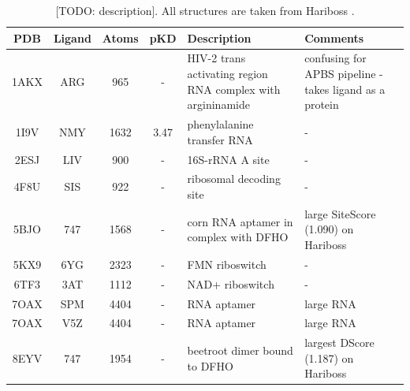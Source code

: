   \begin{table}[H]
    \caption{\label{tab:appx1/benchmark_rna} [TODO: description]. All structures are taken from Hariboss \cite{hariboss_2022}.}
    \centering
    \begin{tabular}{ccccp{1.5in}p{1.5in}}
      \hline
      PDB  & Ligand  & Atoms & pKD  & Description                                                 & Comments                                                \\ \hline
      1AKX & ARG     & 965   & -    & HIV-2 trans activating region RNA complex with argininamide & confusing for APBS pipeline - takes ligand as a protein \\ \hline
      1I9V & NMY     & 1632  & 3.47 & phenylalanine transfer RNA                                  & -                                                       \\ \hline
      2ESJ & LIV     & 900   & -    & 16S-rRNA A site                                             & -                                                       \\ \hline
      4F8U & SIS     & 922   & -    & ribosomal decoding site                                     & -                                                       \\ \hline
      5BJO & 747     & 1568  & -    & corn RNA aptamer in complex with DFHO                       & large SiteScore (1.090) on Hariboss                     \\ \hline
      5KX9 & 6YG     & 2323  & -    & FMN riboswitch                                              & -                                                       \\ \hline
      6TF3 & 3AT     & 1112  & -    & NAD+ riboswitch                                             & -                                                       \\ \hline
      7OAX & SPM     & 4404  & -    & RNA aptamer                                                 & large RNA                                               \\ \hline
      7OAX & V5Z     & 4404  & -    & RNA aptamer                                                 & large RNA                                               \\ \hline
      8EYV & 747     & 1954  & -    & beetroot dimer bound to DFHO                                & largest DScore (1.187) on Hariboss                      \\ \hline
    \end{tabular}
  \end{table}


